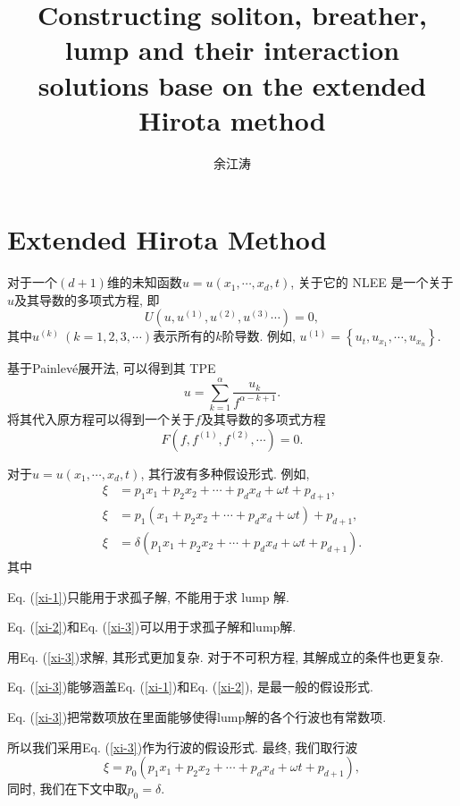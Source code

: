 \documentclass{article}
\newcommand{\sbrace}[1]{\left(#1\right)}
\newcommand{\bbrace}[1]{\left\{#1\right\}}
\newcommand{\up}[1]{^{(#1)}}
\newcommand{\Painleve}{Painlev{\'e}}
\newcommand{\refeqn}[1]{Eq. (\ref{#1})}
\begin{document}
\title{Constructing soliton, breather, lump and their interaction solutions base on the extended Hirota method}
\author{余江涛}
\maketitle

\section{Extended Hirota Method}

对于一个$(d+1)$维的未知函数$u=u(x_1,\cdots,x_d,t)$, 关于它的 NLEE 是一个关于$u$及其导数的多项式方程, 即
\begin{equation}
    U(u,u\up{1},u\up{2},u\up{3}\cdots)=0, \label{oeq}
\end{equation}
其中$u\up{k}~(k=1,2,3,\cdots)$表示所有的$k$阶导数. 例如, $u\up{1}=\bbrace{u_t,u_{x_1},\cdots,u_{x_n}}$.

基于\Painleve{}展开法, 可以得到其 TPE
\begin{equation}
u=\sum_{k=1}^{\alpha}{\frac{u_k}{f^{\alpha-k+1}}}. 
\end{equation}
将其代入原方程可以得到一个关于$f$及其导数的多项式方程 
\begin{equation}
F\sbrace{f,f\up{1},f\up{2},\cdots}=0.
\end{equation}

对于$u=u\sbrace{x_1,\cdots,x_d,t}$, 其行波有多种假设形式. 例如, 
\begin{subequations}
\begin{align}
\xi&=p_1 x_1 + p_2 x_2 + \cdots + p_d x_d + \omega t+p_{d+1},  \label{xi-1}\\ 
\xi&=p_1 (x_1 + p_2 x_2 + \cdots + p_d x_d + \omega t)+p_{d+1}, \label{xi-2}\\ 
\xi&=\delta \sbrace{p_1 x_1 + p_2 x_2 + \cdots + p_d x_d + \omega t+p_{d+1}} \label{xi-3}. 
\end{align}
\end{subequations}
其中
\begin{compactitem}[\textbullet]
\item \refeqn{xi-1}只能用于求孤子解, 不能用于求 lump 解.
\item \refeqn{xi-2}和\refeqn{xi-3}可以用于求孤子解和lump解. 
\item 用\refeqn{xi-3}求解, 其形式更加复杂. 对于不可积方程, 其解成立的条件也更复杂.
\item \refeqn{xi-3}能够涵盖\refeqn{xi-1}和\refeqn{xi-2}, 是最一般的假设形式.
\item \refeqn{xi-3}把常数项放在里面能够使得lump解的各个行波也有常数项.
\end{compactitem}
所以我们采用\refeqn{xi-3}作为行波的假设形式. 最终, 我们取行波
\begin{equation}
  \xi=p_0 \sbrace{p_1 x_1 + p_2 x_2 + \cdots + p_d x_d + \omega t+p_{d+1}},
\end{equation}
同时, 我们在下文中取$p_0=\delta$. 
\end{document}
